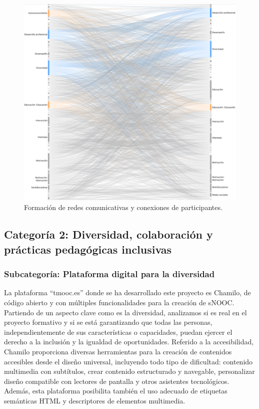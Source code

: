 \begin{figure}[htbp]
	\centering
    \begin{minipage}{\textwidth}
	\caption{Formación de redes comunicativas y conexiones de participantes.}
	\label{fig-09}
	\includegraphics[width=\textwidth]{Imagem9.png}
    \end{minipage}
\end{figure}


\subsection{Categoría 2: Diversidad, colaboración y prácticas pedagógicas inclusivas}\label{sub-section-diversidad}
	
	
\subsubsection{Subcategoría: Plataforma digital para la diversidad}\label{sub-sub-sec-subcategoríaplataformadigital}
	
La plataforma ``tmooc.es'' donde se ha desarrollado este proyecto es
Chamilo, de código abierto y con múltiples funcionalidades para la
creación de sNOOC. Partiendo de un aspecto clave como es la diversidad,
analizamos si es real en el proyecto formativo y si se está garantizando
que todas las personas, independientemente de sus características o
capacidades, puedan ejercer el derecho a la inclusión y la igualdad de
oportunidades. Referido a la accesibilidad, Chamilo proporciona diversas
herramientas para la creación de contenidos accesibles desde el diseño
universal, incluyendo todo tipo de dificultad: contenido multimedia con
subtítulos, crear contenido estructurado y navegable, personalizar
diseño compatible con lectores de pantalla y otros asistentes
tecnológicos. Además, esta plataforma posibilita también el uso adecuado
de etiquetas semánticas HTML y descriptores de elementos multimedia.
	
